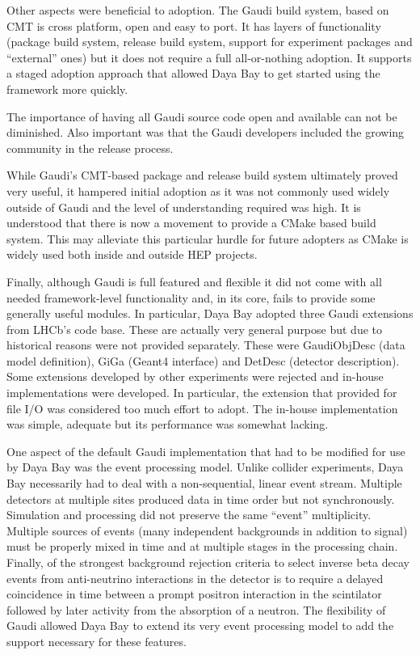 Other aspects were beneficial to adoption.  The Gaudi build system,
based on CMT\cite{cmt} is cross platform, open and easy to port.  It has layers
of functionality (package build system, release build system, support
for experiment packages and ``external'' ones) but it does not require a full
all-or-nothing adoption.  It supports a staged adoption approach that
allowed Daya Bay to get started using the framework more quickly.

The importance of having all Gaudi source code open and available can
not be diminished.  Also important was that the Gaudi developers included
the growing community in the release process.

While Gaudi's CMT-based package and release build system ultimately
proved very useful, it hampered initial adoption as it was not commonly
used widely outside  of Gaudi and the level of understanding required was high.  
It is understood that there is now a
movement to provide a CMake based build system.  This may alleviate
this particular hurdle for future adopters as CMake is widely used both inside and outside HEP projects.

Finally, although Gaudi is full featured and flexible it did not come
with all needed framework-level functionality and, in its core, fails
to provide some generally useful modules.  In particular, Daya Bay
adopted three Gaudi extensions from LHCb's code base.  These are
actually very general purpose but due to historical reasons were not
provided separately.  These were GaudiObjDesc (data model definition),
GiGa (Geant4 interface) and DetDesc (detector description).  Some
extensions developed by other experiments were rejected and in-house
implementations were developed.  In particular, the extension that
provided for file I/O was considered too much effort to adopt.  The
in-house implementation was simple, adequate but its performance was
somewhat lacking.  

One aspect of the default Gaudi implementation that had to be modified for use by Daya
Bay was the event processing model.  Unlike collider
experiments, Daya Bay necessarily had to deal with a non-sequential,
linear event stream.  Multiple detectors at multiple sites produced
data in time order but not synchronously.  Simulation and processing
did not preserve the same ``event'' multiplicity.  Multiple sources of 
events (many independent backgrounds in addition to signal) must be
properly mixed in time and at multiple stages in the processing chain.  
Finally, of the strongest background rejection
criteria to select inverse beta decay events 
from anti-neutrino interactions in the detector
is to require a delayed coincidence in time between a prompt positron
interaction in the scintilator followed by later activity from the
absorption of a neutron.  The flexibility of Gaudi allowed Daya Bay to
extend its very event processing model to add the support necessary
for these features.

